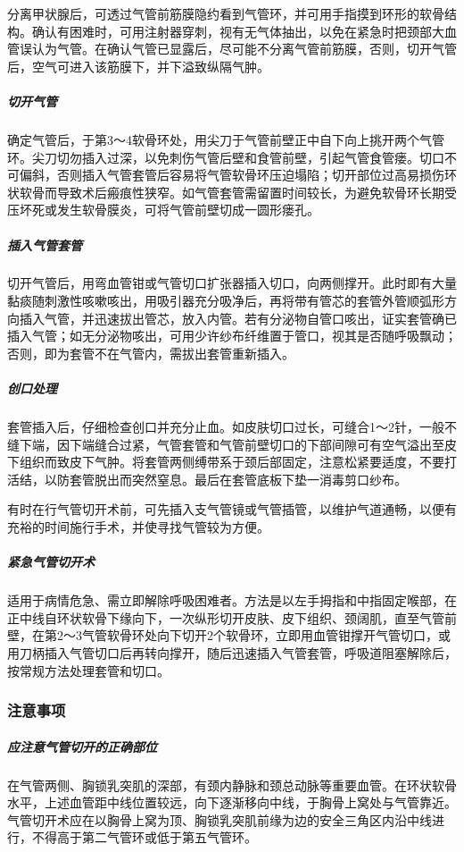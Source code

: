 分离甲状腺后，可透过气管前筋膜隐约看到气管环，并可用手指摸到环形的软骨结构。确认有困难时，可用注射器穿刺，视有无气体抽出，以免在紧急时把颈部大血管误认为气管。在确认气管已显露后，尽可能不分离气管前筋膜，否则，切开气管后，空气可进入该筋膜下，并下溢致纵隔气肿。

\subparagraph{切开气管}

确定气管后，于第3～4软骨环处，用尖刀于气管前壁正中自下向上挑开两个气管环。尖刀切勿插入过深，以免刺伤气管后壁和食管前壁，引起气管食管瘘。切口不可偏斜，否则插入气管套管后容易将气管软骨环压迫塌陷；切开部位过高易损伤环状软骨而导致术后瘢痕性狭窄。如气管套管需留置时间较长，为避免软骨环长期受压坏死或发生软骨膜炎，可将气管前壁切成一圆形瘘孔。

\subparagraph{插入气管套管}

切开气管后，用弯血管钳或气管切口扩张器插入切口，向两侧撑开。此时即有大量黏痰随刺激性咳嗽咳出，用吸引器充分吸净后，再将带有管芯的套管外管顺弧形方向插入气管，并迅速拔出管芯，放入内管。若有分泌物自管口咳出，证实套管确已插入气管；如无分泌物咳出，可用少许纱布纤维置于管口，视其是否随呼吸飘动；否则，即为套管不在气管内，需拔出套管重新插入。

\subparagraph{创口处理}

套管插入后，仔细检查创口并充分止血。如皮肤切口过长，可缝合1～2针，一般不缝下端，因下端缝合过紧，气管套管和气管前壁切口的下部间隙可有空气溢出至皮下组织而致皮下气肿。将套管两侧缚带系于颈后部固定，注意松紧要适度，不要打活结，以防套管脱出而突然窒息。最后在套管底板下垫一消毒剪口纱布。

有时在行气管切开术前，可先插入支气管镜或气管插管，以维护气道通畅，以便有充裕的时间施行手术，并使寻找气管较为方便。

\subparagraph{紧急气管切开术}

适用于病情危急、需立即解除呼吸困难者。方法是以左手拇指和中指固定喉部，在正中线自环状软骨下缘向下，一次纵形切开皮肤、皮下组织、颈阔肌，直至气管前壁，在第2～3气管软骨环处向下切开2个软骨环，立即用血管钳撑开气管切口，或用刀柄插入气管切口后再转向撑开，随后迅速插入气管套管，呼吸道阻塞解除后，按常规方法处理套管和切口。

\subsubsection{注意事项}

\subparagraph{应注意气管切开的正确部位}

在气管两侧、胸锁乳突肌的深部，有颈内静脉和颈总动脉等重要血管。在环状软骨水平，上述血管距中线位置较远，向下逐渐移向中线，于胸骨上窝处与气管靠近。气管切开术应在以胸骨上窝为顶、胸锁乳突肌前缘为边的安全三角区内沿中线进行，不得高于第二气管环或低于第五气管环。

